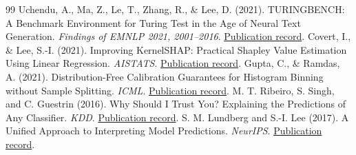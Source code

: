 \begin{thebibliography}{99}
 Uchendu, A., Ma, Z., Le, T., Zhang, R., \& Lee, D. (2021). TURINGBENCH: A Benchmark Environment for Turing Test in the Age of Neural Text Generation. \emph{Findings of EMNLP 2021, 2001–2016}. \href{https://aclanthology.org/2021.findings-emnlp.172/}{Publication record}.
 Covert, I., \& Lee, S.-I. (2021). Improving KernelSHAP: Practical Shapley Value Estimation Using Linear Regression. \emph{AISTATS}. \href{https://proceedings.mlr.press/v130/covert21a.html}{Publication record}.
 Gupta, C., \& Ramdas, A. (2021). Distribution-Free Calibration Guarantees for Histogram Binning without Sample Splitting. \emph{ICML}. \href{https://proceedings.mlr.press/v139/gupta21b.html}{Publication record}.
 M. T. Ribeiro, S. Singh, and C. Guestrin (2016). Why Should I Trust You? Explaining the Predictions of Any Classifier. \emph{KDD}. \href{https://doi.org/10.1145/2939672.2939778}{Publication record}.
 S. M. Lundberg and S.-I. Lee (2017). A Unified Approach to Interpreting Model Predictions. \emph{NeurIPS}. \href{https://arxiv.org/abs/1705.07874}{Publication record}.
\end{thebibliography}
